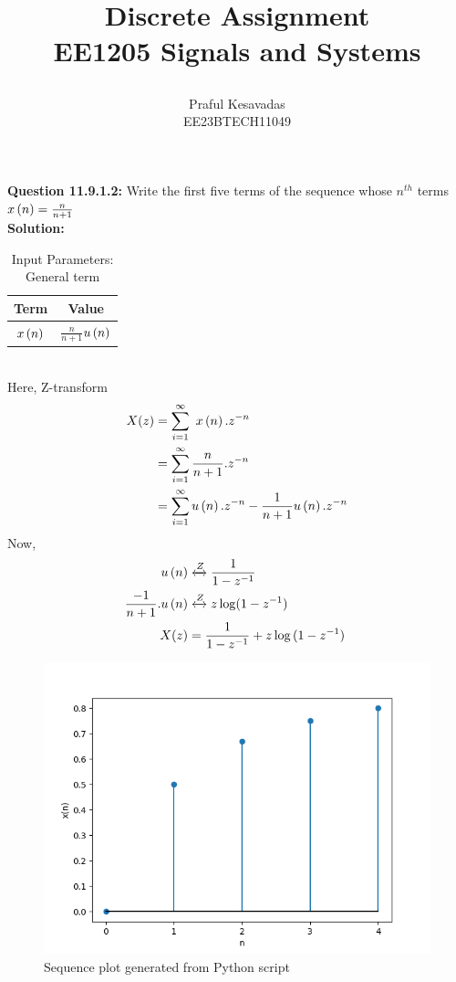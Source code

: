 \documentclass{article}
\begin{document}
\title{
\Huge\textbf{Discrete Assignment}\\
\Huge\textbf{EE1205} Signals and Systems\\
\date{}
}
\large\author{Praful Kesavadas\\EE23BTECH11049}
\maketitle

\textbf{Question 11.9.1.2:}
Write the first five terms of the sequence whose $n^{th}$ terms  $x\left(n\right) = \frac{n}{n+1}$\\
\textbf{Solution:}
\begin{table}[ht]
  \centering
  \begin{tabular}{|c|c|}
    \hline
    \textbf{Term} & \textbf{Value} \\
    \hline
    $x\left(n\right)$ & $\frac{n}{n+1}$$u\left(n\right)$ \\
    \hline
  \end{tabular}
  \caption{Input Parameters: General term}
\end{table}\\
Here, Z-transform
\begin{align}
X(z) &= \sum_{i=1}^\infty\ x\left(n\right).z^{-n}\\
&= \sum_{i=1}^\infty \frac{n}{n+1} . z^{-n}\\
&= \sum_{i=1}^\infty u\left(n\right).z^{-n} - \frac{1}{n+1} u\left(n\right).z^{-n}
\end{align}
Now, 
\begin{align}
u\left(n\right) &\xleftrightarrow Z  \frac{1}{1-z^{-1}}\\
\frac{-1}{n+1}.u\left(n\right) &\xleftrightarrow Z  z\log(1-z^{-1})\\
X(z) &= \frac{1}{1-z^{-1}} + z\log{(1-z^{-1})}\
\end{align}
\begin{figure}[h]
    \centering
    \includegraphics[width=\columnwidth]{figs/graph1.png}
    \caption{Sequence plot generated from Python script}
    \label{fig:sequence-plot}
\end{figure}
\end{document}
